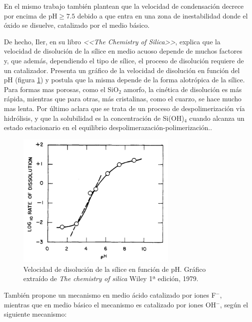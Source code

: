 	En el mismo trabajo\cite{Si-HanWu2013} también plantean que la velocidad de condensación decrece por encima de $\text{pH}\geq7.5$ debido a que entra en una zona de inestabilidad donde el óxido se disuelve, catalizado por el medio básico.
	    	
	De hecho, Iler, en su libro \textit{<<The Chemistry of Silica>>}, explica que la velocidad de disolución de la sílice en medio acuoso depende de muchos factores y, que además, dependiendo el tipo de sílice, el proceso de disolución requiere de un catalizador. Presenta un gráfico de la velocidad de disolución en función del pH (figura \ref{fig:disolucion_ph}) y postula que la misma depende de la forma alotrópica de la sílice. Para formas mas porosas, como el SiO$_2$ amorfo, la cinética de disolución es más rápida, mientras que para otras, más cristalinas, como el cuarzo, se hace mucho mas lenta. Por último aclara que se trata de un proceso de despolimerización vía hidrólisis, y que la solubilidad es la concentración de Si(OH)$_4$ cuando alcanza un estado estacionario en el equilibrio despolimerazación-polimerización.\cite{iler1979,blesa1994}. 

			\begin{figure}[th!]
			    \begin{center}
			    \includegraphics[width=0.70\textwidth]{Graficos/disolucion_ph.jpg}
	       		\caption[Velocidad de disolución sílice en función del pH]{Velocidad de disolución de la sílice en función de pH. Gráfico extraído de \textit{The chemistry of silica} Wiley 1ª edición, 1979.\cite{iler1979}}
	         	\label{fig:disolucion_ph}
	     		\end{center}
	     		\end{figure}
	
	También propone un mecanismo en medio ácido catalizado por iones F$^-$, mientras que en medio básico el mecanismo es catalizado por iones OH$^-$, según el siguiente mecanismo:
		
